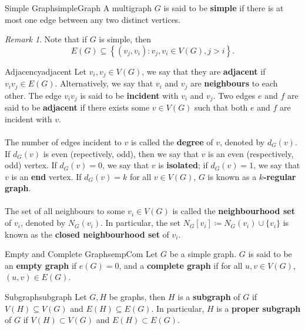\documentclass[math]{amznotes}
\theoremstyle{remark}
\newtheorem*{remark}{Remark}
\begin{document}
\begin{dfnbox}{Simple Graph}{simpleGraph}
    A multigraph $G$ is said to be {\color{red} \textbf{simple}} if there is at most one edge between any two distinct vertices.
\end{dfnbox}
\begin{notebox}
    \begin{remark}
        Note that if $G$ is simple, then
        \begin{displaymath}
            E(G) \subseteq \left\{(v_j, v_i) \colon v_j, v_i \in V(G), j > i\right\}.
        \end{displaymath}
    \end{remark}
\end{notebox}
\begin{dfnbox}{Adjacency}{adjacent}
    Let $v_i, v_j \in V(G)$, we say that they are {\color{red} \textbf{adjacent}} if $v_iv_j \in E(G)$. Alternatively, we say that $v_i$ and $v_j$ are {\color{red} \textbf{neighbours}} to each other. The edge $v_iv_j$ is said to be {\color{red} \textbf{incident}} with $v_i$ and $v_j$. Two edges $e$ and $f$ are said to be {\color{red} \textbf{adjacent}} if there exists some $v \in V(G)$ such that both $e$ and $f$ are incident with $v$. 
    \\\\
    The number of edges incident to $v$ is called the {\color{red} \textbf{degree}} of $v$, denoted by $d_G(v)$. If $d_G(v)$ is even (repectively, odd), then we say that $v$ is an even (respectively, odd) vertex. If $d_G(v) = 0$, we say that $v$ is {\color{red} \textbf{isolated}}; if $d_G(v) = 1$, we say that $v$ is an {\color{red} \textbf{end}} vertex. If $d_G(v) = k$ for all $v \in V(G)$, $G$ is known as a {\color{red} \textbf{$k$-regular graph}}.
    \\\\
    The set of all neighbours to some $v_i \in V(G)$ is called the {\color{red} \textbf{neighbourhood set}} of $v_i$, denoted by $N_G(v_i)$. In particular, the set $N_G[v_i] \coloneqq N_G(v_i)\cup\{v_i\}$ is known as the {\color{red} \textbf{closed neighbourhood set}} of $v_i$.
\end{dfnbox}
\begin{dfnbox}{Empty and Complete Graphs}{empCom}
    Let $G$ be a simple graph. $G$ is said to be an {\color{red} \textbf{empty graph}} if $e(G) = 0$, and a {\color{red} \textbf{complete graph}} if for all $u, v \in V(G)$, $(u, v) \in E(G)$. 
\end{dfnbox}
\begin{dfnbox}{Subgraph}{subgraph}
    Let $G, H$ be graphs, then $H$ is a {\color{red} \textbf{subgraph}} of $G$ if $V(H) \subseteq V(G)$ and $E(H) \subseteq E(G)$. In particular, $H$ is a {\color{red} \textbf{proper subgraph}} of $G$ if $V(H) \subset V(G)$ and $E(H) \subset E(G)$.
\end{dfnbox}
\end{document}

